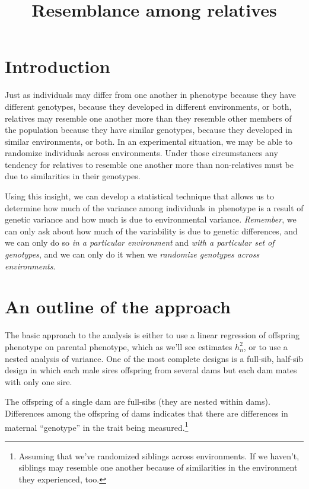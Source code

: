 \documentclass[12pt]{article}
\title{Resemblance among relatives}
\begin{document}
\maketitle

\thispagestyle{first}

\section*{Introduction}

Just as individuals may differ from one another in phenotype 
because they have different genotypes, because they developed in
different environments, or both, relatives may resemble one another
more than they resemble other members of the population because they
have similar genotypes, because they developed in similar
environments, or both. In an experimental situation, we may be able to
randomize individuals across environments. Under those circumstances
any tendency for relatives to resemble one another more than
non-relatives must be due to similarities in their genotypes.

Using this insight, we can develop a statistical technique that allows
us to determine how much of the variance among individuals in
phenotype is a result of genetic variance and how much is due to
environmental variance. {\it Remember}, we can only ask about how much
of the variability is due to genetic differences, and we can only do
so {\it in a particular environment\/} and {\it with a particular set
of genotypes}, and we can only do it when we {\it randomize genotypes
  across environments}.

\section*{An outline of the approach}

The basic approach to the analysis is either to use a linear
regression of offspring phenotype on parental phenotype, which as
we'll see estimates $h^2_n$, or to use a nested analysis of
variance. One of the most complete designs is a full-sib, half-sib
design in which each male sires offspring from several dams but each
dam mates with only one sire. 

The offspring of a single dam are full-sibs (they are nested within
dams). Differences among the offspring of dams indicates that there
are differences in maternal ``genotype'' in the trait being
measured.\footnote{Assuming that we've randomized siblings across
  environments. If we haven't, siblings may resemble one another
  because of similarities in the environment they experienced, too.}
\end{document}
